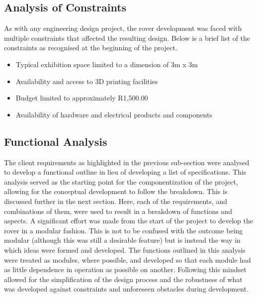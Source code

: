   \subsection{Analysis of Constraints}
    As with any engineering design project, the rover development was faced with multiple constraints that affected the resulting design. Below is a brief list of the constraints as recognised at the beginning of the project.

    \begin{itemize}
      \item Typical exhibition space limited to a dimension of 3m x 3m
      \item Availability and access to 3D printing facilities
      \item Budget limited to approximately R1,500.00
      \item Availability of hardware and electrical products and components
    \end{itemize}

  \subsection{Functional Analysis}
    The client requirements as highlighted in the previous sub-section were analysed to develop a functional outline in lieu of developing a list of specifications. This analysis served as the starting point for the componentization of the project, allowing for the conceptual development to follow the breakdown. This is discussed further in the next section. Here, each of the requirements, and combinations of them, were used to result in a breakdown of functions and aspects. A significant effort was made from the start of the project to develop the rover in a modular fashion. This is not to be confused with the outcome being modular (although this was still a desirable feature) but is instead the way in which ideas were formed and developed. The functions outlined in this analysis were treated as modules, where possible, and developed so that each module had as little dependence in operation as possible on another. Following this mindset allowed for the simplification of the design process and the robustness of what was developed against constraints and unforeseen obstacles during development.


